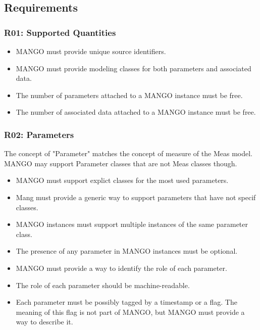 \documentclass[11pt,a4paper]{ivoa}
\begin{document}
\subsection{Requirements}

\subsubsection{R01: Supported Quantities}
\begin{itemize}
    \item MANGO must provide unique source identifiers.
    \item MANGO must provide modeling classes for both parameters and associated data.
    \item The number of parameters attached to a MANGO instance must be free.
    \item The number of associated data attached to a MANGO instance must be free.
\end{itemize}

\subsubsection{R02: Parameters}
The concept of "Parameter" matches the concept of measure of the Meas model. MANGO may support Parameter classes that are not Meas classes though.


\begin{itemize}
    \item MANGO must support explict classes for the most used parameters.
    \item Mang must provide a generic way to support parameters that have not specif classes.
    \item MANGO instances must support multiple instances of the same parameter class.
    \item The presence of any parameter in MANGO instances must be optional.
    \item MANGO must provide a way to identify the role of each parameter.
    \item The role of each parameter should be machine-readable.
    \item Each parameter must be possibly tagged by a timestamp or a flag. The meaning of this flag is not part of MANGO, but MANGO must provide a way to describe it.
\end{itemize}
\end{document}
